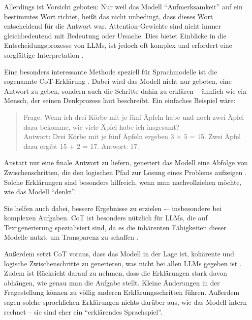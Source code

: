     Allerdings ist Vorsicht geboten:
    Nur weil das Modell \enquote{Aufmerksamkeit} auf ein bestimmtes Wort richtet, heißt das nicht unbedingt, dass dieses Wort entscheidend für die Antwort war.
    Attention-Gewichte sind nicht immer gleichbedeutend mit Bedeutung oder Ursache.
    Dies bietet Einblicke in die Entscheidungsprozesse von \acs{LLM}s, ist jedoch oft komplex und erfordert eine sorgfältige Interpretation \autocite{abnar2020, vaswani2017}.

    Eine besonders interessante Methode speziell für Sprachmodelle ist die sogenannte \acs{CoT}-Erklärung \autocite[S. 1]{wei2022}.
    Dabei wird das Modell nicht nur gebeten, eine Antwort zu geben, sondern auch die Schritte dahin zu erklären – ähnlich wie ein Mensch, der seinen Denkprozess laut beschreibt.
    Ein einfaches Beispiel wäre:

    \begin{quote}
    Frage: Wenn ich drei Körbe mit je fünf Äpfeln habe und noch zwei Äpfel dazu bekomme, wie viele Äpfel habe ich insgesamt? \\
    Antwort: Drei Körbe mit je fünf Äpfeln ergeben 3 × 5 = 15. Zwei Äpfel dazu ergibt 15 + 2 = 17. Antwort: 17.
    \end{quote}

    Anstatt nur eine finale Antwort zu liefern, generiert das Modell eine Abfolge von Zwischenschritten, die den logischen Pfad zur Lösung eines Problems aufzeigen \autocite{wei2022}.
    Solche Erklärungen sind besonders hilfreich, wenn man nachvollziehen möchte, wie das Modell \enquote{denkt}.

    Sie helfen auch dabei, bessere Ergebnisse zu erzielen -– insbesondere bei komplexen Aufgaben.
    \acs{CoT} ist besonders nützlich für LLMs, die auf Textgenerierung spezialisiert sind, da es die inhärenten Fähigkeiten dieser Modelle nutzt, um Transparenz zu schaffen \autocite{wei2022}.

    Außerdem setzt \acs{CoT} voraus, dass das Modell in der Lage ist, kohärente und logische Zwischenschritte zu generieren, was nicht bei allen \acs{LLM}s gegeben ist \autocite{wei2022}.
    Zudem ist Rücksicht darauf zu nehmen, dass die Erklärungen stark davon abhängen, wie genau man die Aufgabe stellt.
    Kleine Änderungen in der Fragestellung können zu völlig anderen Erklärungsschritten führen.
    Außerdem sagen solche sprachlichen Erklärungen nichts darüber aus, wie das Modell intern rechnet – sie sind eher ein \enquote{erklärendes Sprachspiel}.

